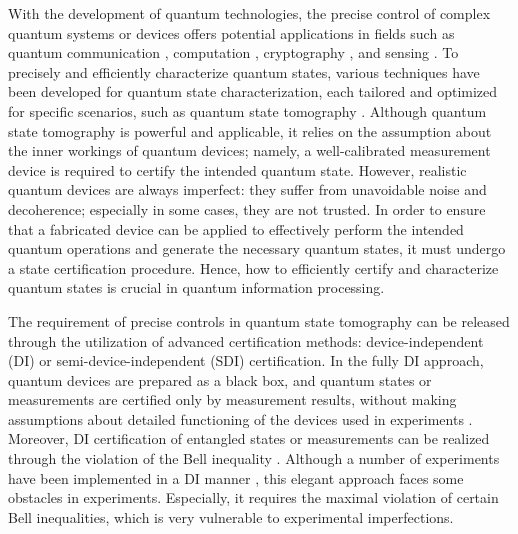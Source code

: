 \documentclass[letterpaper,preprint,superscriptaddress,floatfix,showpacs]{revtex4}
\begin{document}



\maketitle

With the development of quantum technologies, the precise control of complex quantum systems or devices offers potential applications in fields such as quantum communication \cite{Briegel1998}, computation \cite{Reichardt2013}, cryptography \cite{Gisin2002}, and sensing \cite{Giovannetti2011}. To precisely and efficiently characterize quantum states, various techniques have been developed for quantum state characterization, each tailored and optimized for specific scenarios, such as quantum state tomography \cite{Hradil1997,Matteo2004}. Although quantum state tomography is powerful and applicable, it relies on the assumption about the inner workings of quantum devices; namely, a well-calibrated measurement device is required to certify the intended quantum state. However, realistic quantum devices are always imperfect: they suffer from unavoidable noise and decoherence; especially in some cases, they are not trusted. In order to ensure that a fabricated device can be applied to effectively perform the intended quantum operations and generate the necessary quantum states, it must undergo a state certification procedure. Hence, how to efficiently certify and characterize quantum states is crucial in quantum information processing.




The requirement of precise controls in quantum state tomography can be released through the utilization of advanced certification methods: device-independent (DI) or semi-device-independent (SDI) certification. In the fully DI approach, quantum devices are prepared as a black box, and quantum states or measurements are certified only by measurement results, without making assumptions about detailed functioning of the devices used in experiments \cite{supis2020}. Moreover, DI certification of entangled states or measurements can be realized through the violation of the Bell inequality \cite{chen2021,zhao2023,chen2016}. Although a number of experiments have been implemented in a DI manner \cite{Smania2020, Zhang2018}, this elegant approach faces some obstacles in experiments. Especially, it requires the maximal violation of certain Bell inequalities, which is very vulnerable to experimental imperfections.
\end{document}
